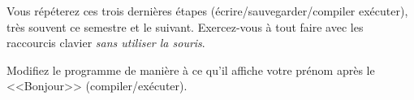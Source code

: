 Vous répéterez ces trois dernières étapes (écrire/sauvegarder/compiler exécuter), très souvent ce semestre et le suivant. Exercez-vous à tout faire avec les raccourcis clavier \emph{sans utiliser la souris}.  


\begin{lastenu} 
\item Modifiez le programme de manière à ce qu'il affiche
  votre prénom après le <<Bonjour>> (compiler/exécuter).
\end{lastenu}


